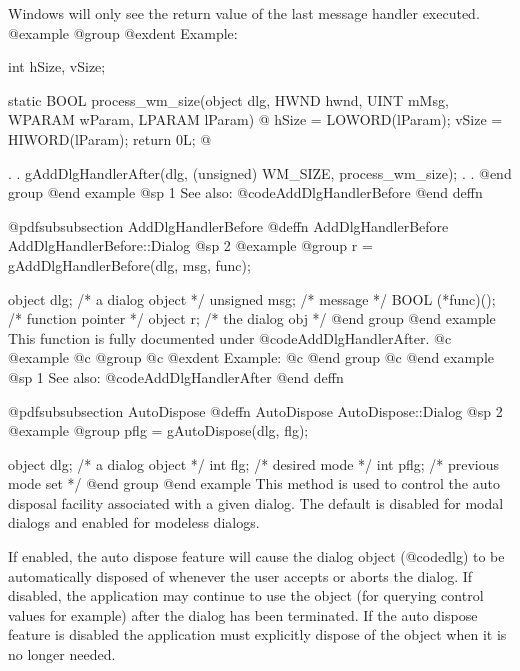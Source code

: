 Windows will only see the return value of the last message handler executed.
@example
@group
@exdent Example:

int     hSize, vSize;

static  BOOL    process_wm_size(object  dlg, 
                                HWND    hwnd, 
                                UINT    mMsg, 
                                WPARAM  wParam, 
                                LPARAM  lParam)
@{
        hSize = LOWORD(lParam);
        vSize = HIWORD(lParam);
        return 0L;
@}

        .
        .
        gAddDlgHandlerAfter(dlg, (unsigned) WM_SIZE,
                                      process_wm_size);
        .
        .
@end group
@end example
@sp 1
See also:  @code{AddDlgHandlerBefore}
@end deffn












@pdfsubsubsection {AddDlgHandlerBefore}
@deffn {AddDlgHandlerBefore} AddDlgHandlerBefore::Dialog
@sp 2
@example
@group
r = gAddDlgHandlerBefore(dlg, msg, func);

object   dlg;     /*  a dialog object  */
unsigned msg;      /*  message          */
BOOL    (*func)(); /*  function pointer */
object  r;         /*  the dialog obj   */
@end group
@end example
This function is fully documented under @code{AddDlgHandlerAfter}.
@c @example
@c @group
@c @exdent Example:
@c @end group
@c @end example
@sp 1
See also:  @code{AddDlgHandlerAfter}
@end deffn













@pdfsubsubsection {AutoDispose}
@deffn {AutoDispose} AutoDispose::Dialog
@sp 2
@example
@group
pflg = gAutoDispose(dlg, flg);

object  dlg;    /*  a dialog object    */
int     flg;    /*  desired mode       */
int     pflg;   /*  previous mode set  */
@end group
@end example
This method is used to control the auto disposal facility associated with
a given dialog.  The default is disabled for modal dialogs and enabled
for modeless dialogs.

If enabled, the auto dispose feature will cause the dialog object
(@code{dlg}) to be automatically disposed of whenever the user accepts
or aborts the dialog.  If disabled, the application may continue to use
the object (for querying control values for example) after the dialog
has been terminated.  If the auto dispose feature is disabled the
application must explicitly dispose of the object when it is no longer
needed.


